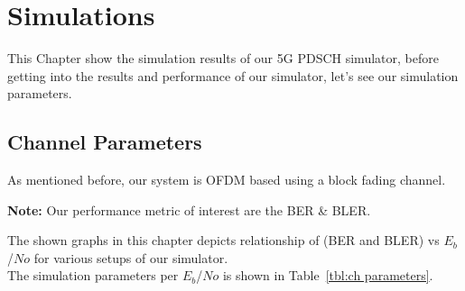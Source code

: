 \chapter{Simulations}
This Chapter show the simulation results of our 5G PDSCH simulator, before getting into the results and performance of our simulator, let's see our simulation parameters.
\section{Channel Parameters}
As mentioned before, our system is OFDM based using a block fading channel.
\begin{GrayBox}
    \textbf{Note:} Our performance metric of interest are the BER \& BLER.
\end{GrayBox}
The shown graphs in this chapter depicts relationship of (BER and BLER) vs $E_b$/$No$ for various setups of our simulator.\\
The simulation parameters per $E_b$/$No$ is shown in Table~\ref{tbl:ch parameters}.
